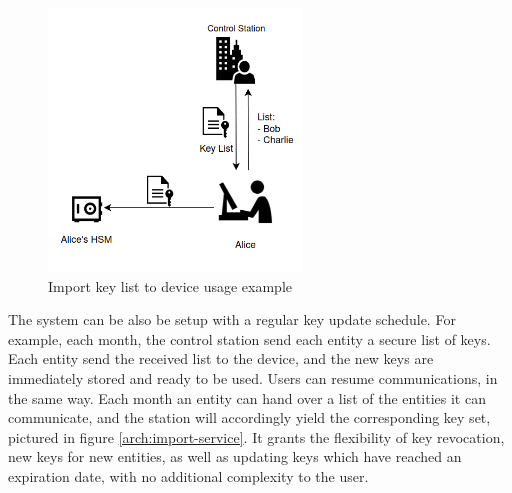 \begin{figure}[h]
    \centering
    \includegraphics[width=0.6\textwidth]{./Images/arch-import-service.png}
    \caption{Import key list to device usage example}
    \label{fig:arch:import-service}
\end{figure}

The system can be also be setup with a regular key update schedule. For example, each month, the control station send each entity a secure list of keys. Each entity send the received list to the device, and the new keys are immediately stored and ready to be used.
Users can resume communications, in the same way.
Each month an entity can hand over a list of the entities it can communicate, and the station will accordingly yield the corresponding key set, pictured in figure \ref{arch:import-service}.
It grants the flexibility of key revocation, new keys for new entities, as well as updating keys which have reached an expiration date, with no additional complexity to the user.




